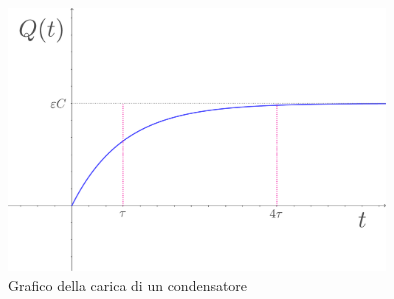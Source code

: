 \documentclass[a3paper, twoside, openany]{book}
\theoremstyle{definition}
\begin{document}
\begin{figure}[htp]
    \centering
    \includegraphics[width=10cm]{Carica}
    \caption{Grafico della carica di un condensatore}
    \label{fig:carica}
\end{figure}
\end{document}
